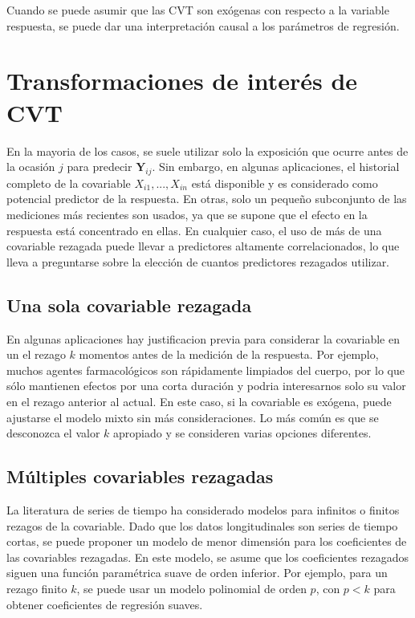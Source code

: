 \documentclass[spanish]{article}
\numberwithin{figure}{subsection}
\numberwithin{equation}{subsection}
\numberwithin{table}{subsection}
\begin{document}
Cuando se puede asumir que las CVT son exógenas con respecto a la variable
respuesta, se puede dar una interpretación causal a los parámetros de regresión.



\section{Transformaciones de interés de CVT}

En la mayoria de los casos, se suele utilizar solo la exposición que ocurre
antes de la ocasión $j$ para predecir $\bm{Y}_{ij}$. Sin embargo, en algunas
aplicaciones, el historial completo de la covariable $X_{i1}, ..., X_{in}$
está disponible y es considerado como potencial predictor de la respuesta. En
otras, solo un pequeño subconjunto de las mediciones más recientes son usados,
ya que se supone que el efecto en la respuesta está concentrado en ellas. En
cualquier caso, el uso de más de una covariable rezagada puede llevar a
predictores altamente correlacionados, lo que lleva a preguntarse sobre la
elección de cuantos predictores rezagados utilizar.

\subsection{Una sola covariable rezagada}

En algunas aplicaciones hay justificacion previa para considerar la covariable
en un el rezago $k$ momentos antes de la medición de la respuesta. Por ejemplo,
muchos agentes farmacológicos son rápidamente limpiados del cuerpo, por lo que
sólo mantienen efectos por una corta duración y podria interesarnos solo su
valor en el rezago anterior al actual. En este caso, si la covariable es
exógena, puede ajustarse el modelo mixto sin más consideraciones. Lo más común
es que se desconozca el valor $k$ apropiado y se consideren varias opciones
diferentes.

\subsection{Múltiples covariables rezagadas}

La literatura de series de tiempo ha considerado modelos para infinitos o
finitos rezagos de la covariable. Dado que los datos longitudinales son series
de tiempo cortas, se puede proponer un modelo de menor dimensión para los
coeficientes de las covariables rezagadas. En este modelo, se asume que los
coeficientes rezagados siguen una función paramétrica suave de orden inferior.
Por ejemplo, para un rezago finito $k$, se puede usar un modelo polinomial de
orden $p$, con $p < k$ para obtener coeficientes de regresión suaves.
\end{document}

